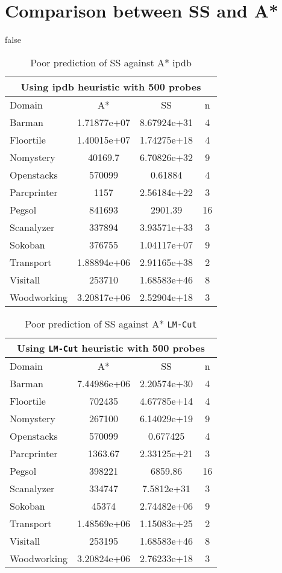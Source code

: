 \section{Comparison between SS and A*}

\if false
\begin{table}[]
\centering
\caption{Poor prediction of SS against A* ipdb}
\label{tb:pred_ss_a_ipdb}
\begin{tabular}{lccc}
\hline
\multicolumn{4}{c}{Using ipdb heuristic with 500 probes} \\ \hline
Domain         & A*             & SS             & n     \\ \hline
Barman         & 1.71877e+07    & 8.67924e+31    & 4     \\
Floortile      & 1.40015e+07    & 1.74275e+18    & 4     \\
Nomystery      & 40169.7        & 6.70826e+32    & 9     \\
Openstacks     & 570099         & 0.61884        & 4     \\
Parcprinter    & 1157           & 2.56184e+22    & 3     \\
Pegsol         & 841693         & 2901.39        & 16    \\
Scanalyzer     & 337894         & 3.93571e+33    & 3     \\
Sokoban        & 376755         & 1.04117e+07    & 9     \\
Transport      & 1.88894e+06    & 2.91165e+38    & 2     \\
Visitall       & 253710         & 1.68583e+46    & 8     \\
Woodworking    & 3.20817e+06    & 2.52904e+18    & 3     \\ \hline
\end{tabular}
\end{table}

\begin{table}[]
\centering
\caption{Poor prediction of SS against A* \texttt{LM-Cut}}
\label{tb:pred_ss_a_lmcut}
\begin{tabular}{lccc}
\hline
\multicolumn{4}{c}{Using \texttt{LM-Cut} heuristic with 500 probes} \\ \hline
Domain& A*& SS& n \\ \hline

Barman& 7.44986e+06& 2.20574e+30& 4\\
Floortile& 702435& 4.67785e+14& 4\\
Nomystery& 267100& 6.14029e+19& 9\\
Openstacks& 570099& 0.677425& 4\\
Parcprinter& 1363.67& 2.33125e+21& 3\\
Pegsol& 398221& 6859.86& 16\\
Scanalyzer& 334747& 7.5812e+31& 3\\
Sokoban& 45374& 2.74482e+06& 9\\
Transport& 1.48569e+06& 1.15083e+25& 2\\
Visitall& 253195& 1.68583e+46& 8\\
Woodworking& 3.20824e+06& 2.76233e+18& 3\\ \hline
\end{tabular}
\end{table}

